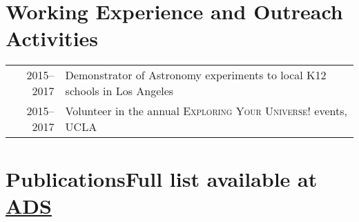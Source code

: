 \documentclass[letterpaper,10pt]{article}
\begin{document}
\section{Working Experience and Outreach Activities}

\begin{tabular}{rp{5.4in}}
\textsc{2015--2017}  & Demonstrator of Astronomy experiments to local K12 schools in Los Angeles    \\
\textsc{2015--2017}  & Volunteer in the annual \textsc{Exploring Your Universe!} events, UCLA   \\
\end{tabular}



\section{Publications\hfill Full list available at \href{https://ui.adsabs.harvard.edu/public-libraries/D2s74Q15TomjQ7uGtxK5gQ}{ADS}}
\end{document}
